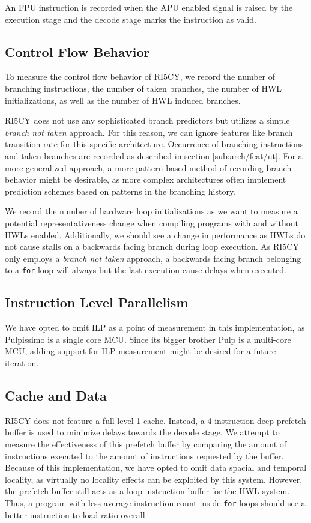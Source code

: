 \documentclass[../bachelor_paper.tex]{subfiles}
\begin{document}
An \ac{FPU} instruction is recorded when the \ac{APU} enabled signal is raised by the execution stage and the decode stage marks the instruction as valid.

\subsection{Control Flow Behavior}
    \label{sub:arch/feat/ctrl}
To measure the control flow behavior of RI5CY, we record the number of branching instructions, the number of taken branches, the number of \ac{HWL} initializations, as well as the number of \ac{HWL} induced branches.

RI5CY does not use any sophisticated branch predictors but utilizes a simple \emph{branch not taken} approach. For this reason, we can ignore features like branch transition rate \cite{haungsBranchTransitionRate2000} for this specific architecture. Occurrence of branching instructions and taken branches are recorded as described in section \ref{sub:arch/feat/ut}. For a more generalized approach, a more pattern based method of recording branch behavior might be desirable, as more complex architectures often implement prediction schemes based on patterns in the branching history.

We record the number of hardware loop initializations as we want to measure a potential representativeness change when compiling programs with and without \acp{HWL} enabled. Additionally, we should see a change in performance as \acp{HWL} do not cause stalls on a backwards facing branch during loop execution. As RI5CY only employs a \emph{branch not taken} approach, a backwards facing branch belonging to a \texttt{for}-loop will always but the last execution cause delays when executed.

\subsection{Instruction Level Parallelism}
We have opted to omit \ac{ILP} as a point of measurement in this implementation, as Pulpissimo is a single core \ac{MCU}. Since its bigger brother Pulp \cite{pulliniMrWolfEnergyPrecision2019} is a multi-core \ac{MCU}, adding support for \ac{ILP} measurement might be desired for a future iteration.

\subsection{Cache and Data}
RI5CY does not feature a full level 1 cache. Instead, a 4 instruction deep prefetch buffer is used to minimize delays towards the decode stage. We attempt to measure the effectiveness of this prefetch buffer by comparing the amount of instructions executed to the amount of instructions requested by the buffer. Because of this implementation, we have opted to omit data spacial and temporal locality, as virtually no locality effects can be exploited by this system. However, the prefetch buffer still acts as a loop instruction buffer for the \ac{HWL} system. Thus, a program with less average instruction count inside \texttt{for}-loops should see a better instruction to load ratio overall.
\end{document}
